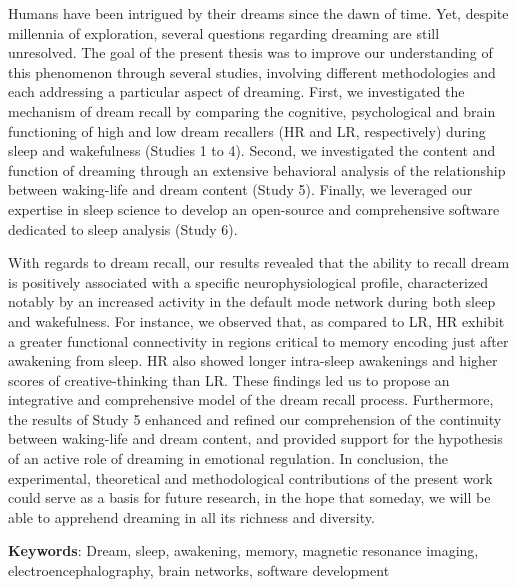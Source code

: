 \label{sec:abstract}
\vspace*{-10mm}

Humans have been intrigued by their dreams since the dawn of time. Yet, despite millennia of exploration, several questions regarding dreaming are still unresolved. The goal of the present thesis was to improve our understanding of this phenomenon through several studies, involving different methodologies and each addressing a particular aspect of dreaming. First, we investigated the mechanism of dream recall by comparing the cognitive, psychological and brain functioning of high and low dream recallers (HR and LR, respectively) during sleep and wakefulness (Studies 1 to 4). Second, we investigated the content and function of dreaming through an extensive behavioral analysis of the relationship between waking-life and dream content (Study 5). Finally, we leveraged our expertise in sleep science to develop an open-source and comprehensive software dedicated to sleep analysis (Study 6).

With regards to dream recall, our results revealed that the ability to recall dream is positively associated with a specific neurophysiological profile, characterized notably by an increased activity in the default mode network during both sleep and wakefulness. For instance, we observed that, as compared to LR, HR exhibit a greater functional connectivity in regions critical to memory encoding just after awakening from sleep. HR also showed longer intra-sleep awakenings and higher scores of creative-thinking than LR. These findings led us to propose an integrative and comprehensive model of the dream recall process. Furthermore, the results of Study 5 enhanced and refined our comprehension of the continuity between waking-life and dream content, and provided support for the hypothesis of an active role of dreaming in emotional regulation. In conclusion, the experimental, theoretical and methodological contributions of the present work could serve as a basis for future research, in the hope that someday, we will be able to apprehend dreaming in all its richness and diversity.


\textbf{Keywords}: Dream, sleep, awakening, memory, magnetic resonance imaging, electroencephalography, brain networks, software development

\cleardoublepage

\label{sec:résumé}
\vspace*{-10mm}

